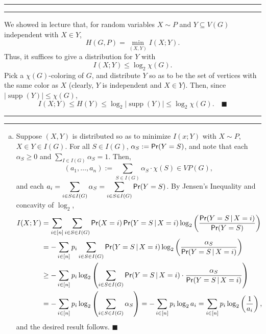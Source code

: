 \documentclass[11pt]{article}
\newcounter{questionCounter}
\newcounter{partCounter}[questionCounter]
\newenvironment{question}[2][\arabic{questionCounter}]{%
    \setcounter{partCounter}{0}%
    \vspace{.25in} \hrule \vspace{0.5em}%
        \noindent{\bf #2}%
    \vspace{0.8em} \hrule \vspace{.10in}%
    \addtocounter{questionCounter}{1}%
}{}
\renewcommand{\qed}{\quad $\blacksquare$}
\newcommand{\mqed}{\quad \blacksquare}
\newcommand{\supp}{\operatorname{supp}} %
\newcommand{\pr}{\operatornamewithlimits{\mathsf{Pr}}} %
\newcommand{\giv}{\, | \,} %
\begin{document}
\begin{question}{Problem 3}
We showed in lecture that, for random variables $X \sim P$ and
$Y \subseteq V(G)$ independent with $X \in Y$,
\[H(G,P) = \min_{(X,Y)} I(X;Y).\]
Thus, it suffices to give a distribution for $Y$ with
\[I(X ; Y) \leq \log_2 \chi(G).\]
Pick a $\chi(G)$-coloring of $G$, and distribute $Y$ so as to be the set of
vertices with the same color as $X$ (clearly, $Y$ is independent and
$X \in Y$). Then, since $|\supp(Y)| \leq \chi(G)$,
\[I(X ; Y) \leq H(Y) \leq \log_2 |\supp(Y)| \leq \log_2 \chi(G). \mqed\]
\vspace{-0.2in}
\end{question}

\begin{question}{Problem 4}
\begin{enumerate}[(a)]
\item Suppose $(X,Y)$ is distributed so as to minimize $I(x;Y)$ with
$X \sim P$, $X \in Y \in I(G)$. For all $S \in I(G)$,
$\alpha_S := \pr(Y = S)$, and note that each $\alpha_S \geq 0$ and
$\sum_{I \in I(G)} \alpha_S = 1$. Then,
\[(a_1,\dots,a_n) := \sum_{S \in I(G)} \alpha_S \cdot \chi(S) \in VP(G),\]
and each
$\displaystyle a_i
    = \sum_{i \in S \in I(G)} \alpha_S
    = \sum_{i \in S \in I(G)} \pr(Y = S)$.
By Jensen's Inequality and concavity of $\log_2$,
\begin{align*}
I(X;Y)
    & = \sum_{i \in [n]} \sum_{i \in S \in I(G)}
            \pr(X = i)\pr(Y = S \giv X = i) \log_2
                \left( \frac{\pr(Y = S \giv X = i)}{\pr(Y = S)} \right)     \\
    & = -\sum_{i \in [n]} p_i
            \sum_{i \in S \in I(G)} \pr(Y = S \giv X = i)
            \log_2 \left( \frac{\alpha_S}{\pr(Y = S \giv X = i)} \right)    \\
    & \geq -\sum_{i \in [n]} p_i
            \log_2 \left( \sum_{i \in S \in I(G)} \pr(Y = S \giv X = i)
            \cdot \frac{\alpha_S}{\pr(Y = S \giv X = i)} \right)            \\
    & = -\sum_{i \in [n]} p_i
                \log_2 \left( \sum_{i \in S \in I(G)} \alpha_S \right)
      = -\sum_{i \in [n]} p_i \log_2 a_i
      = \sum_{i \in [n]} p_i \log_2 \left( \frac{1}{a_i} \right),
\end{align*}
and the desired result follows. \qed


\end{enumerate}
\end{question}
\end{document}
